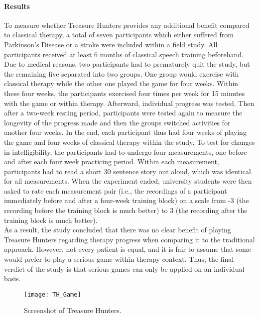 \documentclass[draft,final]{vutinfth} %
\begin{document}
\paragraph{Results} To measure whether Treasure Hunters provides any additional benefit compared to classical therapy, a total of seven participants which either suffered from Parkinson's Disease or a stroke were included within a field study. All participants received at least 6 months of classical speech training beforehand. Due to medical reasons, two participants had to prematurely quit the study, but the remaining five separated into two groups. One group would exercise with classical therapy while the other one played the game for four weeks. Within these four weeks, the participants exercised four times per week for 15 minutes with the game or within therapy. Afterward, individual progress was tested. Then after a two-week resting period, participants were tested again to measure the longevity of the progress made and then the groups switched activities for another four weeks. In the end, each participant thus had four weeks of playing the game and four weeks of classical therapy within the study. To test for changes in intelligibility, the participants had to undergo four measurements, one before and after each four week practicing period. Within each measurement, participants had to read a short 30 sentence story out aloud, which was identical for all measurements. When the experiment ended, university students were then asked to rate each measurement pair (i.e., the recordings of a participant immediately before and after a  four-week training block) on a scale from -3 (the recording before the training block is much better) to 3 (the recording after the training block is much better). 
\\ As a result, the study concluded that there was no clear benefit of playing Treasure Hunters regarding therapy progress when comparing it to the traditional approach. However, not every patient is equal, and it is fair to assume that some would prefer to play a serious game within therapy context. Thus, the final verdict of the study is that serious games can only be applied on an individual basis.
\begin{figure}
\begin{center}
\texttt{[image: TH\_Game]}
\end{center}
\caption{Screenshot of Treasure Hunters\cite{TreasureHunters}.}
\end{figure}
\end{document}
